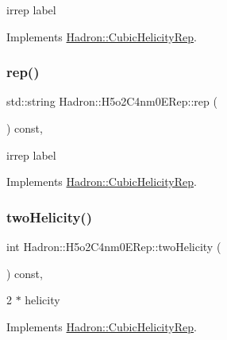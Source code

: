 irrep label 

Implements \mbox{\hyperlink{structHadron_1_1CubicHelicityRep_a8cdd86f068a167dc96faef02bfb8a33d}{Hadron\+::\+Cubic\+Helicity\+Rep}}.

\mbox{\label{structHadron_1_1H5o2C4nm0ERep_a72959e5415b9a2c1a841e0c35b4c1045}} 
\subsubsection{\texorpdfstring{rep()}{rep()}\hspace{0.1cm}{\footnotesize\ttfamily [3/3]}}
{\footnotesize\ttfamily std\+::string Hadron\+::\+H5o2\+C4nm0\+E\+Rep\+::rep (\begin{DoxyParamCaption}{ }\end{DoxyParamCaption}) const\hspace{0.3cm}{\ttfamily [inline]}, {\ttfamily [virtual]}}

irrep label 

Implements \mbox{\hyperlink{structHadron_1_1CubicHelicityRep_a8cdd86f068a167dc96faef02bfb8a33d}{Hadron\+::\+Cubic\+Helicity\+Rep}}.

\mbox{\label{structHadron_1_1H5o2C4nm0ERep_a3f459ff8e7a5af2e24b6bc9b86d70a87}} 
\subsubsection{\texorpdfstring{twoHelicity()}{twoHelicity()}\hspace{0.1cm}{\footnotesize\ttfamily [1/3]}}
{\footnotesize\ttfamily int Hadron\+::\+H5o2\+C4nm0\+E\+Rep\+::two\+Helicity (\begin{DoxyParamCaption}{ }\end{DoxyParamCaption}) const\hspace{0.3cm}{\ttfamily [inline]}, {\ttfamily [virtual]}}

2 $\ast$ helicity 

Implements \mbox{\hyperlink{structHadron_1_1CubicHelicityRep_af507aa56fc2747eacc8cb6c96db31ecc}{Hadron\+::\+Cubic\+Helicity\+Rep}}.

\mbox{\label{structHadron_1_1H5o2C4nm0ERep_a3f459ff8e7a5af2e24b6bc9b86d70a87}} 
